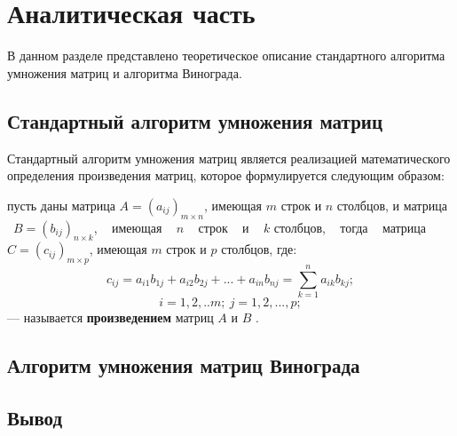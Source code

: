 \chapter{Аналитическая часть}

В данном разделе представлено теоретическое описание стандартного алгоритма
умножения матриц и алгоритма Винограда.

\section{Стандартный алгоритм умножения матриц}

Стандартный алгоритм умножения матриц является реализацией математического
определения произведения матриц, которое формулируется следующим образом:

    пусть даны матрица $A = (a_{ij})_{m \times n}$, имеющая $m$ строк и $n$
столбцов, и матрица ~$B = (b_{ij})_{n \times k}$, ~ имеющая ~ $n$ ~ строк ~ и ~
$k$ столбцов, ~ тогда ~ матрица\\ ${C=(c_{ij})_{m \times p}}$, имеющая $m$
строк и $p$ столбцов, где:
$$c_{ij}=a_{i1}b_{1j}+a_{i2}b_{2j} +...+a_{in}b_{nj}=\sum\limits_{k=1}^n
a_{ik}b_{kj};$$
$$i = 1,2,..m;~j = 1,2,...,p;$$
--- называется \textbf{произведением} матриц $A$ и $B$ \cite{math}.

\section{Алгоритм умножения матриц Винограда}

\section{Вывод}

